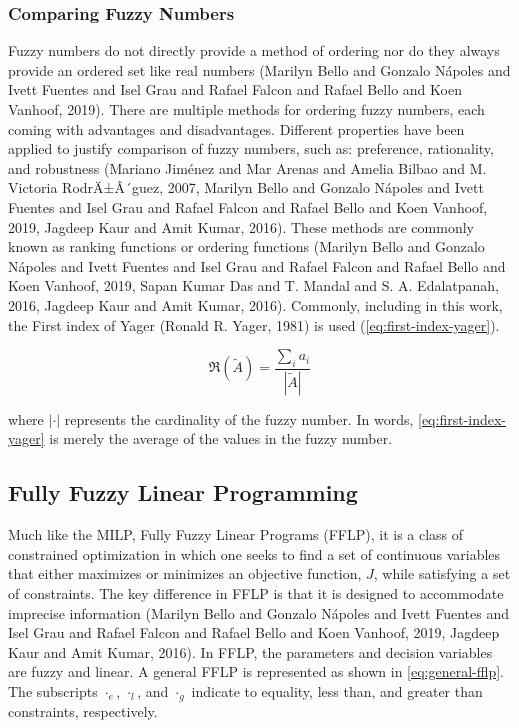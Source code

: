 \documentclass[11pt,a4paper,final]{article}
\begin{document}
\subsubsection{Comparing Fuzzy Numbers}
\label{sec:org5296760}
Fuzzy numbers do not directly provide a method of ordering nor do they always provide an ordered set like real numbers
(Marilyn Bello and Gonzalo N{\'a}poles and Ivett Fuentes and Isel Grau and Rafael Falcon and Rafael Bello and Koen Vanhoof, 2019). There are multiple methods for ordering fuzzy numbers, each coming with advantages and
disadvantages. Different properties have been applied to justify comparison of fuzzy numbers, such as: preference,
rationality, and robustness (Mariano Jim{\'e}nez and Mar Arenas and Amelia Bilbao and M. Victoria RodrÄ±Â´guez, 2007, Marilyn Bello and Gonzalo N{\'a}poles and Ivett Fuentes and Isel Grau and Rafael Falcon and Rafael Bello and Koen Vanhoof, 2019, Jagdeep Kaur and Amit Kumar, 2016). These
methods are commonly known as ranking functions or ordering functions
(Marilyn Bello and Gonzalo N{\'a}poles and Ivett Fuentes and Isel Grau and Rafael Falcon and Rafael Bello and Koen Vanhoof, 2019, Sapan Kumar Das and T. Mandal and S. A. Edalatpanah, 2016, Jagdeep Kaur and Amit Kumar, 2016). Commonly, including in this work, the First
index of Yager (Ronald R. Yager, 1981) is used (\ref{eq:first-index-yager}).

\begin{equation}
\label{eq:first-index-yager}
\mathfrak{R}(\tilde{A}) = \frac{\sum_i a_i}{|\tilde{A}|}
\end{equation}

\noindent
where \(|\cdot|\) represents the cardinality of the fuzzy number. In words, \ref{eq:first-index-yager} is merely the average
of the values in the fuzzy number.

\subsection{Fully Fuzzy Linear Programming}
\label{sec:org603ef85}
Much like the MILP, Fully Fuzzy Linear Programs (FFLP), it is a class of constrained optimization in which one seeks to
find a set of continuous variables that either maximizes or minimizes an objective function, \(J\), while satisfying a set
of constraints. The key difference in FFLP is that it is designed to accommodate imprecise information
(Marilyn Bello and Gonzalo N{\'a}poles and Ivett Fuentes and Isel Grau and Rafael Falcon and Rafael Bello and Koen Vanhoof, 2019, Jagdeep Kaur and Amit Kumar, 2016). In FFLP, the parameters and decision variables are fuzzy and
linear. A general FFLP is represented as shown in \ref{eq:general-fflp}. The subscripts \(\cdot_e\), \(\cdot_l\), and \(\cdot_g\) indicate to
equality, less than, and greater than constraints, respectively.
\end{document}
